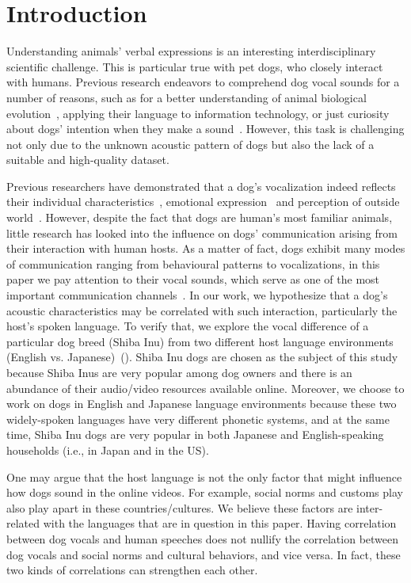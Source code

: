 \section{Introduction}
\label{sec:intro}

Understanding animals' verbal expressions is an interesting interdisciplinary 
scientific challenge. This is  particular true with pet dogs, 
who closely interact with humans. 
Previous research endeavors to comprehend dog vocal sounds for a number 
of reasons, such as for a better understanding of animal biological 
evolution~\cite{pongracz2017modeling}, applying their language to information 
technology, or just curiosity about dogs' intention when they make a sound~\cite{pongracz2011children,dogbark_1}. However, this task is challenging not only due to the unknown acoustic pattern of dogs but also the lack of a suitable and high-quality dataset.

Previous researchers have demonstrated that a dog's vocalization indeed reflects 
their individual characteristics~\cite{pongracz2010barking,larranaga2015comparing}, emotional expression~\cite{thorndike2017animal,hantke2018my,paladini2020bark} and perception of outside world~\cite{larranaga2015comparing, molnar2008classification}. However, despite the fact that dogs are human's most familiar animals, 
little research has looked into the influence on dogs' communication arising from their interaction with human hosts. As a matter of fact, dogs exhibit many modes of 
communication ranging from behavioural patterns to vocalizations, in this paper we pay attention to their vocal sounds, which serve as one of 
the most important communication channels~\cite{siniscalchi2018communication}. 
In our work, we hypothesize that a dog's acoustic characteristics may be 
correlated with such interaction, particularly the host's spoken language. 
To verify that, we explore the vocal difference of a particular dog breed 
(Shiba Inu) from two different host language environments (English vs. Japanese)~(). Shiba Inu dogs are chosen as the subject of this study because Shiba Inus are very popular among dog owners and there is an abundance of their audio/video resources available online.  Moreover, we choose to work on dogs in English and Japanese language environments because these two widely-spoken languages have very different phonetic systems, and at the same time, Shiba Inu dogs are very popular in both Japanese and English-speaking households (i.e., in Japan and in the US). 

One may argue that the host language is not the 
only factor that might influence how dogs sound in the online videos. 
For example, social norms and customs play also play apart in these 
countries/cultures. We believe these factors are inter-related with the 
languages that are in question in this paper. 
Having correlation between dog vocals and human speeches does not nullify the correlation between dog vocals and social norms and cultural behaviors, and vice versa. In fact, these two kinds of correlations can strengthen each other.


